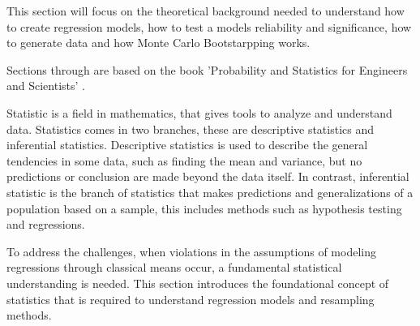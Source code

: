 This section will focus on the theoretical background needed to understand how to create regression models, how to test a models reliability and significance, how to generate data and how Monte Carlo Bootstarpping works.

Sections through are based on the book 'Probability and Statistics for Engineers and Scientists' \cite{ProbAndStat}. \newline

\noindent Statistic is a field in mathematics, that gives tools to analyze and understand data. Statistics comes in two branches, these are descriptive statistics and inferential statistics. Descriptive statistics is used to describe the general tendencies in some data, such as finding the mean and variance, but no predictions or conclusion are made beyond the data itself. In contrast, inferential statistic is the branch of statistics that makes predictions and generalizations of a population based on a sample, this includes methods such as hypothesis testing and regressions. 

\noindent To address the challenges, when violations in the assumptions of modeling regressions through classical means occur, a fundamental statistical understanding is needed. This section introduces the foundational concept of statistics that is required to understand regression models and resampling methods.






\newpage


